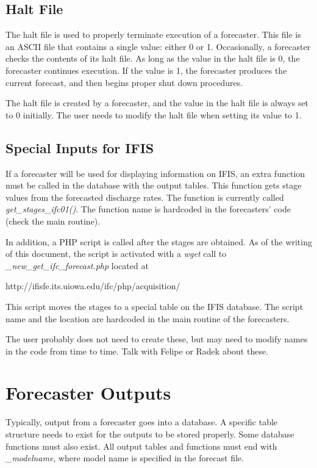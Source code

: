 \documentclass[12pt]{article}
\newenvironment{codeindent}
{\begin{list}{}
        {\setlength{\leftmargin}{.1in}}
        \item[]
}
{\end{list}}
\begin{document}
\subsection{Halt File} \label{sec: halt file}

The halt file is used to properly terminate execution of a forecaster. This file is an ASCII file that contains a single value: either 0 or 1. Occasionally, a forecaster checks the contents of its halt file. As long as the value in the halt file is 0, the forecaster continues execution. If the value is 1, the forecaster produces the current forecast, and then begins proper shut down procedures.

The halt file is created by a forecaster, and the value in the halt file is always set to 0 initially. The user needs to modify the halt file when setting its value to 1.

\subsection{Special Inputs for IFIS} \label{sec: database functions for IFIS}

If a forecaster will be used for displaying information on IFIS, an extra function must be called in the database with the output tables. This function gets stage values from the forecasted discharge rates. The function is currently called \emph{get\_stages\_ifc01()}. The function name is hardcoded in the forecasters' code (check the main routine).

In addition, a PHP script is called after the stages are obtained. As of the writing of this document, the script is activated with a \emph{wget} call to \emph{\_new\_get\_ifc\_forecast.php} located at
\begin{codeindent}
http://ifisfe.its.uiowa.edu/ifc/php/acquisition/
\end{codeindent}
This script moves the stages to a special table on the IFIS database. The script name and the location are hardcoded in the main routine of the forecasters.

The user probably does not need to create these, but may need to modify names in the code from time to time. Talk with Felipe or Radek about these.


\section{Forecaster Outputs} \label{sec: forecaster outputs}

Typically, output from a forecaster goes into a database. A specific table structure needs to exist for the outputs to be stored properly. Some database functions must also exist. All output tables and functions must end with \mbox{\emph{\_modelname}}, where model name is specified in the forecast file.
\end{document}
